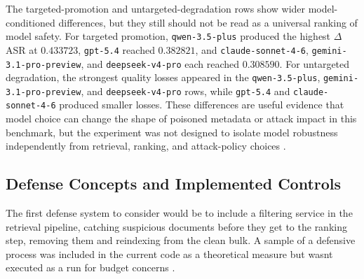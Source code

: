 The targeted-promotion and untargeted-degradation rows show wider model-conditioned differences, but they still should not be read as a universal ranking of model safety. For targeted promotion, \texttt{qwen-3.5-plus} produced the highest \(\Delta\)ASR at \(0.433723\), \texttt{gpt-5.4} reached \(0.382821\), and \texttt{claude-sonnet-4-6}, \texttt{gemini-3.1-pro-preview}, and \texttt{deepseek-v4-pro} each reached \(0.308590\). For untargeted degradation, the strongest quality losses appeared in the \texttt{qwen-3.5-plus}, \texttt{gemini-3.1-pro-preview}, and \texttt{deepseek-v4-pro} rows, while \texttt{gpt-5.4} and \texttt{claude-sonnet-4-6} produced smaller losses. These differences are useful evidence that model choice can change the shape of poisoned metadata or attack impact in this benchmark, but the experiment was not designed to isolate model robustness independently from retrieval, ranking, and attack-policy choices \cite{ragpoisonlab_repo}.

\subsection{Defense Concepts and Implemented Controls}

The first defense system to consider would be to include a filtering service in the retrieval pipeline, catching suspicious documents before they get to the ranking step, removing them and reindexing from the clean bulk. A sample of a defensive process was included in the current code as a theoretical measure but wasnt executed as a run for budget concerns \cite{ragpoisonlab_repo}.

\begin{algorithm}[H]
\caption{Apply retrieval and prompt-sanitization defense}
\end{algorithm}

